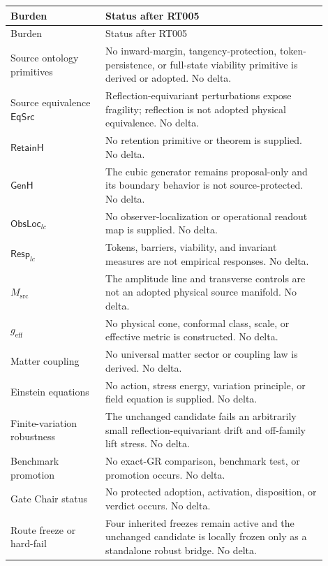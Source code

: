 \documentclass[11pt]{article}
\begin{document}
\begin{longtable}{P{0.27\linewidth}P{0.63\linewidth}}
\toprule
Burden & Status after RT005 \\
\midrule
\endfirsthead
\toprule
Burden & Status after RT005 \\
\midrule
\endhead
Source ontology primitives & No inward-margin, tangency-protection, token-persistence, or full-state viability primitive is derived or adopted.  No delta.\\
Source equivalence $\mathsf{EqSrc}$ & Reflection-equivariant perturbations expose fragility; reflection is not adopted physical equivalence.  No delta.\\
$\mathsf{RetainH}$ & No retention primitive or theorem is supplied.  No delta.\\
$\mathsf{GenH}$ & The cubic generator remains proposal-only and its boundary behavior is not source-protected.  No delta.\\
$\mathsf{ObsLoc}_{lc}$ & No observer-localization or operational readout map is supplied.  No delta.\\
$\mathsf{Resp}_{lc}$ & Tokens, barriers, viability, and invariant measures are not empirical responses.  No delta.\\
$M_{\mathrm{src}}$ & The amplitude line and transverse controls are not an adopted physical source manifold.  No delta.\\
$g_{\mathrm{eff}}$ & No physical cone, conformal class, scale, or effective metric is constructed.  No delta.\\
Matter coupling & No universal matter sector or coupling law is derived.  No delta.\\
Einstein equations & No action, stress energy, variation principle, or field equation is supplied.  No delta.\\
Finite-variation robustness & The unchanged candidate fails an arbitrarily small reflection-equivariant drift and off-family lift stress.  No delta.\\
Benchmark promotion & No exact-GR comparison, benchmark test, or promotion occurs.  No delta.\\
Gate Chair status & No protected adoption, activation, disposition, or verdict occurs.  No delta.\\
Route freeze or hard-fail & Four inherited freezes remain active and the unchanged candidate is locally frozen only as a standalone robust bridge.  No delta.\\
\bottomrule
\end{longtable}
\end{document}
